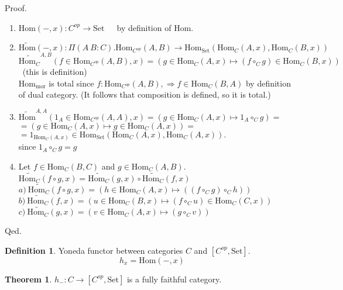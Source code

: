 \documentclass[10pt,a4paper]{article}
\theoremstyle{definition}
\newtheorem{definition}{Definition}[section]
\newtheorem{theorem}{Theorem}[section]
\newcommand{\Hom}{{\mbox{Hom}}}
\newcommand{\mor}{{\mbox{mor}}}
\newcommand{\Set}{{\mbox{Set}}}
\newcommand{\ra}{{\rightarrow}}
\begin{document}
\noindent Proof.
\begin{enumerate}
\item $\Hom(-, x) : C^{op} \ra \Set$\ \ \ by definition of $\Hom$.
\item $\widetilde{\Hom}(-, x) :\Pi(A\ B:C).\Hom_{C^{op}}(A,B) \ra \Hom_\Set(\Hom_C(A,x), \Hom_C(B,x))$\\
$\widetilde{\Hom_C}^{A,B}(f\in\Hom_{C^{op}}(A,B), x) = (g \in\Hom_C(A,x) \mapsto (f \circ_C g) \in\Hom_C(B,x))$\ (this is definition)\\
$\Hom_\mor$ is total since $f:\Hom_{C^{op}}(A,B), \Rightarrow f\in\Hom_C(B,A)$ by definition of dual category. (It follows that composition is defined, so it is total.)
\item $\widetilde{\Hom}^{A,A}(1_A\in\Hom_{C^{op}}(A,A), x) = \left(g \in\Hom_C(A,x)\mapsto 1_A \circ_C g\right) = $\\
$= \left(g \in\Hom_C(A,x) \mapsto g \in\Hom_C(A,x)\right) =$\\
$= 1_{\Hom_C(A,x)} \in \Hom_\Set\left(\Hom_C(A,x), \Hom_C(A,x)\right).$\\
since $1_A \circ_C g = g$\\
\item Let $f\in\Hom_C(B,C)$ and $g\in\Hom_C(A,B)$.\\
$\widetilde{\Hom_C}(f\circ g, x) = \widetilde{\Hom_C}(g, x) \circ \widetilde{\Hom_C}(f, x)$\\
$a)\ \widetilde{\Hom_C}(f\circ g, x) = (h \in\Hom_C(A,x) \mapsto ((f\circ_C g) \circ_C h))$\\
$b)\ \widetilde{\Hom_C}(f, x) = (u \in\Hom_C(B,x) \mapsto (f \circ_C u)\in\Hom_C(C,x))$\\
$c)\ \widetilde{\Hom_C}(g, x) = (v \in\Hom_C(A,x) \mapsto (g \circ_C v))$\\
\end{enumerate}
Qed.
\begin{definition}
Yoneda functor between categories $C$ and $[C^{op},\Set]$.
$$h_x = \Hom(-, x)$$
\end{definition}
\begin{theorem}
$h_{-}:C\rightarrow [C^{op},\Set]$ is a fully faithful category.
\end{theorem}
\end{document}
